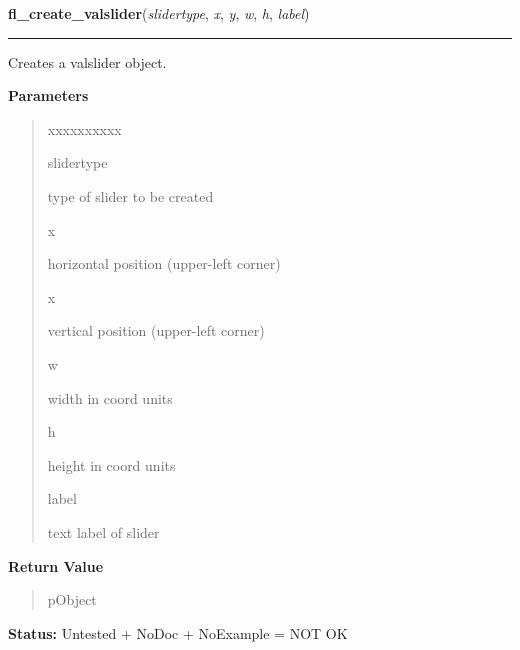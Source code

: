     \label{xformslib:library:fl_create_valslider}

    \vspace{0.5ex}

\hspace{.8\funcindent}\begin{boxedminipage}{\funcwidth}

    \raggedright \textbf{fl\_create\_valslider}(\textit{slidertype}, \textit{x}, \textit{y}, \textit{w}, \textit{h}, \textit{label})

    \vspace{-1.5ex}

    \rule{\textwidth}{0.5\fboxrule}
\setlength{\parskip}{2ex}
    Creates a valslider object.

\setlength{\parskip}{1ex}
      \textbf{Parameters}
      \vspace{-1ex}

      \begin{quote}
        \begin{Ventry}{xxxxxxxxxx}

          \item[slidertype]

          type of slider to be created

          \item[x]

          horizontal position (upper-left corner)

          \item[x]

          vertical position (upper-left corner)

          \item[w]

          width in coord units

          \item[h]

          height in coord units

          \item[label]

          text label of slider

        \end{Ventry}

      \end{quote}

      \textbf{Return Value}
    \vspace{-1ex}

      \begin{quote}
      pObject

      \end{quote}

\textbf{Status:} Untested + NoDoc + NoExample = NOT OK



    \end{boxedminipage}

